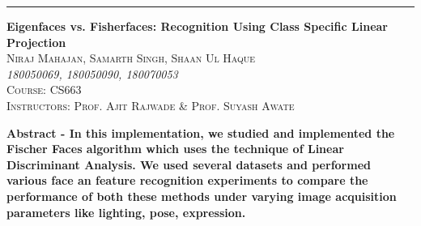 \documentclass[12pt, a4paper]{article}
\begin{document}
\begin{titlepage} %
	
	\raggedleft %
	
	\rule{1pt}{\textheight} %
	\hspace{0.05\textwidth} %
	\parbox[b]{0.75\textwidth}{ %
		
		{\Huge\bfseries Eigenfaces vs. Fisherfaces:
        Recognition Using Class Specific Linear Projection}\\[2\baselineskip] %
		
		{\Large\textsc{Niraj Mahajan, Samarth Singh, Shaan Ul Haque}}\\[0.25\baselineskip]%
		
		{\large\textit{180050069, 180050090, 180070053}}\\[2\baselineskip] %
		
		{\Large\textsc{Course: CS663}}\\[0.5\baselineskip]
		
		{\Large\textsc{Instructors: Prof. Ajit Rajwade \& Prof. Suyash Awate}}
		\vspace{0.5\textheight} %
		
	}

\end{titlepage}
\newpage

\textbf{Abstract -
In this implementation, we studied and implemented the Fischer Faces algorithm \cite{598228} which uses the technique of Linear Discriminant Analysis. We used several datasets and performed various face an feature recognition experiments to compare the performance of both these methods under varying image acquisition parameters like lighting, pose, expression.
}\\
\end{document}

